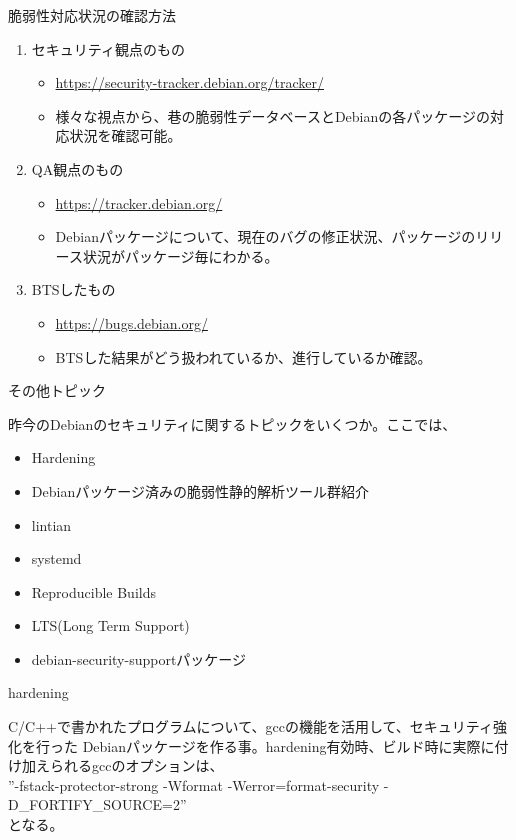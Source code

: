 \begin{frame}{脆弱性対応状況の確認方法}

\begin{enumerate}
\item セキュリティ観点のもの
  \begin{itemize}
  \item \url{https://security-tracker.debian.org/tracker/}
  \item 様々な視点から、巷の脆弱性データベースとDebianの各パッケージの対応状況を確認可能。
  \end{itemize}
\item QA観点のもの
  \begin{itemize}
  \item \url{https://tracker.debian.org/}
    　\item Debianパッケージについて、現在のバグの修正状況、パッケージのリリース状況がパッケージ毎にわかる。
  \end{itemize}
\item BTSしたもの
  \begin{itemize}
  \item \url{https://bugs.debian.org/}
  \item BTSした結果がどう扱われているか、進行しているか確認。
  \end{itemize}  
\end{enumerate}

\end{frame}

\begin{frame}{その他トピック}

  昨今のDebianのセキュリティに関するトピックをいくつか。ここでは、

  \begin{itemize}
  \item Hardening
  \item Debianパッケージ済みの脆弱性静的解析ツール群紹介
  \item lintian
  \item systemd
  \item Reproducible Builds
 　\item LTS(Long Term Support)
  \item debian-security-supportパッケージ
  \end{itemize}
\end{frame}

\begin{frame}{hardening}

 C/C++で書かれたプログラムについて、gccの機能を活用して、セキュリティ強化を行った
Debianパッケージを作る事。hardening有効時、ビルド時に実際に付け加えられるgccのオプションは、
\\
''-fstack-protector-strong -Wformat -Werror=format-security -D\_FORTIFY\_SOURCE=2''\\
となる。

\end{frame} 

